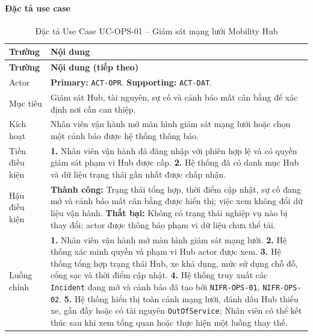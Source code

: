 \paragraph{Đặc tả use case}
\small
\begin{longtable}{|L{26mm}|L{118mm}|}
  \caption{Đặc tả Use Case UC-OPS-01 -- Giám sát mạng lưới Mobility Hub}\label{tab:spec-UC-OPS-01}\\
  \hline
  \centering\arraybackslash\textbf{Trường} & \centering\arraybackslash\textbf{Nội dung}\\
  \hline
  \endfirsthead
  \hline
  \centering\arraybackslash\textbf{Trường} & \centering\arraybackslash\textbf{Nội dung (tiếp theo)}\\
  \hline
  \endhead
  Actor & \textbf{Primary:} \texttt{ACT-OPR}. \textbf{Supporting:} \texttt{ACT-DAT}.\\\hline
  Mục tiêu & Giám sát Hub, tài nguyên, sự cố và cảnh báo mất cân bằng để xác định nơi cần can thiệp.\\\hline
  Kích hoạt & Nhân viên vận hành mở màn hình giám sát mạng lưới hoặc chọn một cảnh báo được hệ thống thông báo.\\\hline
  Tiền điều kiện &
    \textbf{1.} Nhân viên vận hành đã đăng nhập với phiên hợp lệ và có quyền giám sát phạm vi Hub được cấp.\newline
    \textbf{2.} Hệ thống đã có danh mục Hub và dữ liệu trạng thái gần nhất được chấp nhận.\\\hline
  Hậu điều kiện &
    \textbf{Thành công:} Trạng thái tổng hợp, thời điểm cập nhật, sự cố đang mở và cảnh báo mất cân bằng được hiển thị; việc xem không đổi dữ liệu vận hành.\newline
    \textbf{Thất bại:} Không có trạng thái nghiệp vụ nào bị thay đổi; actor được thông báo phạm vi dữ liệu chưa thể tải.\\\hline
  Luồng chính &
    \textbf{1.} Nhân viên vận hành mở màn hình giám sát mạng lưới.\newline
    \textbf{2.} Hệ thống xác minh quyền và phạm vi Hub actor được xem.\newline
    \textbf{3.} Hệ thống tổng hợp trạng thái Hub, xe khả dụng, mức sử dụng chỗ đỗ, cổng sạc và thời điểm cập nhật.\newline
    \textbf{4.} Hệ thống truy xuất các \texttt{Incident} đang mở và cảnh báo đã tạo bởi \texttt{NIFR-OPS-01}, \texttt{NIFR-OPS-02}.\newline
    \textbf{5.} Hệ thống hiển thị toàn cảnh mạng lưới, đánh dấu Hub thiếu xe, gần đầy hoặc có tài nguyên \texttt{OutOfService}; Nhân viên có thể kết thúc sau khi xem tổng quan hoặc thực hiện một luồng thay thế.\\\hline

\end{longtable}
